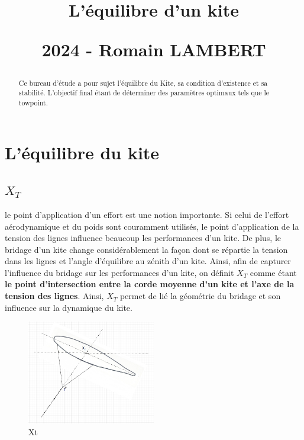 \documentclass[conference]{IEEEtran}
\begin{document}
\title{\LARGE L'équilibre d'un kite
\vskip10pt

\small 2024 - Romain LAMBERT
}
\maketitle

\begin{abstract}Ce bureau d'étude a pour sujet l'équilibre du Kite, sa condition d'existence et sa stabilité. L'objectif final étant de déterminer des paramètres optimaux tels que le towpoint. 
\end{abstract}
\IEEEoverridecommandlockouts

\IEEEpeerreviewmaketitle
\section{L'équilibre du kite}

\subsection{$X_T$} 

le point d'application d'un effort est une notion importante. Si celui de l'effort aérodynamique et du poids sont couramment utilisés, le point d'application de la tension des lignes influence beaucoup les performances d'un kite. De plus, le bridage d'un kite change considérablement la façon dont se répartie la tension dans les lignes et l'angle d'équilibre au zénith d'un kite. Ainsi, afin de capturer l'influence du bridage sur les performances d'un kite, on définit $X_T$ comme étant \textbf{le point d'intersection entre la corde moyenne d'un kite et l'axe de la tension des lignes}. Ainsi, $X_T$ permet de lié la géométrie du bridage et son influence sur la dynamique du kite.  \\

\begin{figure}[H]
    \centering
    \includegraphics[width=0.5\textwidth]{Pics/Xt.png}  
    \caption{Xt}
    \label{fig:Xt}
\end{figure}
\end{document}
